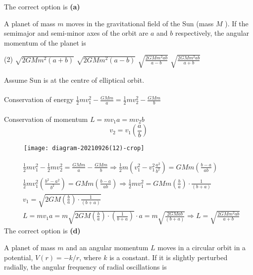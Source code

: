 \begin{enumerate}
\begin{answer}
 The correct option is \textbf{(a)}	
\end{answer}
\begin{minipage}{\textwidth}
	\item A planet of mass $m$ moves in the gravitational field of the Sun (mass $M$ ). If the semimajor and semi-minor axes of the orbit are $a$ and $b$ respectively, the angular momentum of the planet is
\end{minipage}
\begin{tasks}(2)
	\task[\textbf{A.}]$\sqrt{2 G M m^{2}(a+b)}$
	\task[\textbf{B.}]$\sqrt{2 G M m^{2}(a-b)}$
	\task[\textbf{C.}]$\sqrt{\frac{2 G M m^{2} a b}{a-b}}$
	\task[\textbf{D.}]$\sqrt{\frac{2 G M m^{2} a b}{a+b}}$
\end{tasks}
\begin{answer}
	 Assume Sun is at the centre of elliptical orbit.\\\\
	Conservation of energy $\frac{1}{2} m v_{1}^{2}-\frac{G M m}{a}=\frac{1}{2} m v_{2}^{2}-\frac{G M m}{b}$\\\\
	Conservation of momentum $L=m v_{1} a=m v_{2} b$
	$$
	v_{2}=v_{1}\left(\frac{a}{b}\right)
	$$
	\begin{figure}[H]
		\centering
		\texttt{[image: diagram-20210926(12)-crop]}
	\end{figure}
	\begin{align*}
		&\frac{1}{2} m v_{1}^{2}-\frac{1}{2} m v_{2}^{2}=\frac{G M m}{a}-\frac{G M m}{b} \Rightarrow \frac{1}{2} m\left(v_{1}^{2}-v_{1}^{2} \frac{a^{2}}{b^{2}}\right)=G M m\left(\frac{b-a}{a b}\right) \\
		&\frac{1}{2} m v_{1}^{2}\left(\frac{b^{2}-a^{2}}{b^{2}}\right)=G M m\left(\frac{b-a}{a b}\right) \Rightarrow \frac{1}{2} m v_{1}^{2}=G M m\left(\frac{b}{a}\right) \cdot \frac{1}{(b+a)} \\
		&v_{1}=\sqrt{2 G M\left(\frac{b}{a}\right) \cdot \frac{1}{(b+a)}} \\
		&L=m v_{1} a=m \sqrt{2 G M\left(\frac{b}{a}\right) \cdot\left(\frac{1}{b+a}\right)} \cdot a=m \sqrt{\frac{2 G M a b}{(b+a)}} \Rightarrow L=\sqrt{\frac{2 G M m^{2} a b}{a+b}}
	\end{align*}
	The correct option is \textbf{(d)}
\end{answer}
\begin{minipage}{\textwidth}
	\item A planet of mass $m$ and an angular momentum $L$ moves in a circular orbit in a potential, $V(r)=-k / r$, where $k$ is a constant. If it is slightly perturbed radially, the angular frequency of radial oscillations is

\end{minipage}
\end{enumerate}
